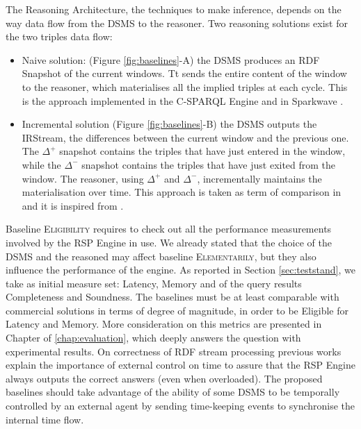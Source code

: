 The Reasoning Architecture, the techniques to make inference, depends on the way data flow from the DSMS to the reasoner. Two reasoning solutions exist for the two triples data flow:

\begin{itemize}
\item Naive solution: (Figure \ref{fig:baselines}-A) the DSMS produces an RDF Snapshot of the current windows. Tt sends the entire content of the window to the reasoner, which materialises all the implied triples at each cycle. This is the approach implemented in the C-SPARQL Engine \cite{DBLP:journals/sigmod/BarbieriBCVG10} and in Sparkwave \cite{DBLP:conf/debs/KomazecCF12}.
\item Incremental solution (Figure \ref{fig:baselines}-B) the DSMS outputs the IRStream, the differences between the current window and the previous one. The $\Delta^{+}$ snapshot contains the triples that have just entered in the window, while the $\Delta^{-}$ snapshot contains the triples that have just exited from the window. The reasoner, using $\Delta^{+}$ and $\Delta^{-}$, incrementally maintains the materialisation over time. This approach is taken as term of comparison in \cite{DellAglio2014} and it is inspired from \cite{DBLP:conf/cikm/RenP11}.
\end{itemize}

Baseline \textsc{Eligibility} requires to check out all the performance measurements involved by the RSP Engine in use. We already stated that the choice of the DSMS and the reasoned may affect baseline \textsc{Elementarily}, but they also influence the performance of the engine. As reported in Section \ref{sec:teststand}, we take as initial measure set: Latency, Memory and of the query results Completeness and Soundness. The baselines must be at least comparable with commercial solutions in terms of degree of magnitude, in order to be Eligible for Latency and Memory. More consideration on this metrics are presented in Chapter of \ref{chap:evaluation}, which deeply answers the question with experimental results. On correctness of RDF stream processing \cite{DBLP:conf/semweb/DellAglioCBCV13} previous works explain the importance of external control on time to assure that the RSP Engine always outputs the correct answers (even when overloaded). The proposed baselines should take advantage of the ability of some DSMS to be temporally controlled by an external agent by sending time-keeping events to synchronise the internal time flow. %

